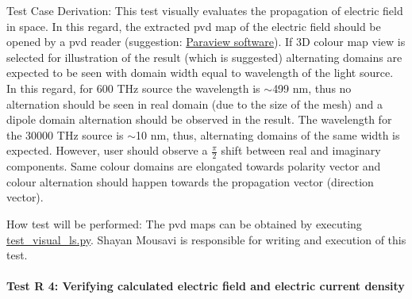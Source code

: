 \documentclass[12pt, titlepage]{article}
\begin{document}
\begin{enumerate}
\begin{itemize}
	\end{itemize}	
	Test Case Derivation: This test visually evaluates the propagation of electric field in space. In this regard, the extracted pvd map of the electric field should be opened by a pvd reader (suggestion: \href{https://www.paraview.org/}{Paraview software}). If 3D colour map view is selected for illustration of the result (which is suggested) alternating domains are expected to be seen with domain width equal to wavelength of the light source. In this regard, for 600 THz source the wavelength is $\sim$499 nm, thus no alternation should be seen in real domain (due to the size of the mesh) and a dipole domain alternation should be observed in the result. The wavelength for the 30000 THz source is $\sim$10 nm, thus, alternating domains of the same width is expected. However, user should observe a $\frac{\pi}{2}$ shift between real and imaginary components. Same colour domains are elongated towards polarity vector and colour alternation should happen towards the propagation vector (direction vector).      
	
	How test will be performed: The pvd maps can be obtained by executing \href{https://github.com/shmouses/SPDFM/tree/master/src/test_visual_ls.py}{test\_visual\_ls.py}. Shayan Mousavi is responsible for writing and execution of this test.   
	
\end{enumerate}



\paragraph{Test R 4: Verifying calculated electric field and electric current density}
\end{document}
